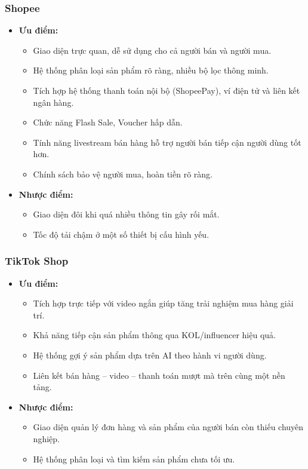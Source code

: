 \documentclass[../DoAn.tex]{subfiles}
\begin{document}
\subsubsection*{Shopee}
\label{subsection:2.1.1.1}
\begin{itemize}
  \item \textbf{Ưu điểm:}
  \begin{itemize}
    \item Giao diện trực quan, dễ sử dụng cho cả người bán và người mua.
    \item Hệ thống phân loại sản phẩm rõ ràng, nhiều bộ lọc thông minh.
    \item Tích hợp hệ thống thanh toán nội bộ (ShopeePay), ví điện tử và liên kết ngân hàng.
    \item Chức năng Flash Sale, Voucher hấp dẫn.
    \item Tính năng livestream bán hàng hỗ trợ người bán tiếp cận người dùng tốt hơn.
    \item Chính sách bảo vệ người mua, hoàn tiền rõ ràng.
  \end{itemize}

  \item \textbf{Nhược điểm:}
  \begin{itemize}
    \item Giao diện đôi khi quá nhiều thông tin gây rối mắt.
    \item Tốc độ tải chậm ở một số thiết bị cấu hình yếu.
  \end{itemize}
\end{itemize}

\subsubsection*{TikTok Shop}
\label{subsection:2.1.1.2}
\begin{itemize}
  \item \textbf{Ưu điểm:}
  \begin{itemize}
    \item Tích hợp trực tiếp với video ngắn giúp tăng trải nghiệm mua hàng giải trí.
    \item Khả năng tiếp cận sản phẩm thông qua KOL/influencer hiệu quả.
    \item Hệ thống gợi ý sản phẩm dựa trên AI theo hành vi người dùng.
    \item Liên kết bán hàng – video – thanh toán mượt mà trên cùng một nền tảng.
  \end{itemize}

  \item \textbf{Nhược điểm:}
  \begin{itemize}
    \item Giao diện quản lý đơn hàng và sản phẩm của người bán còn thiếu chuyên nghiệp.
    \item Hệ thống phân loại và tìm kiếm sản phẩm chưa tối ưu.
  \end{itemize}
\end{itemize}
\end{document}
